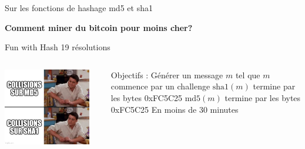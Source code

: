 \begin{frame}{Sur les fonctions de hashage md5 et sha1}
    \large{\centerline{\textbf{Comment miner du bitcoin pour moins cher?}}}

\end{frame}


\begin{frame}{Fun with Hash \FiveStar\FiveStar \hfill 19 résolutions}
    \begin{columns}[c]
        \begin{center}                  
            \includegraphics[width=0.9\textwidth]{img/meme/fun-intro.png}
        \end{center}

           \begin{outline}
               \1 Objectifs : Générer un message $m$ tel que
                \2 $m$ commence par un challenge
                \2 $\text{sha1}(m)$ termine par les bytes 0xFC5C25
                \2 $\text{md5}(m)$ termine par les bytes 0xFC5C25
                \2 En moins de 30 minutes
           \end{outline}
    \end{columns}
\end{frame}


